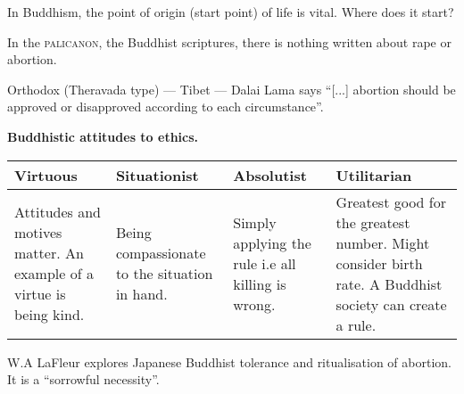 \documentclass{article}
\begin{document}
In Buddhism, the point of origin (start point) of life is vital.  Where does it start?

In the \textsc{palicanon}, the Buddhist scriptures, there is nothing written about rape or abortion.

Orthodox (Theravada type) --- Tibet --- Dalai Lama says ``[...] abortion should be approved or disapproved according to each circumstance''.

\textbf{Buddhistic attitudes to ethics.}

\begin{tabular}{ | p{3cm} | p{3cm} | p{3cm} | p{3cm} | }
\hline
Virtuous & Situationist & Absolutist & Utilitarian \\ \hline
Attitudes and motives matter.  An example of a virtue is being kind. & Being compassionate to the situation in hand. & Simply applying the rule i.e all killing is wrong. & Greatest good for the greatest number.  Might consider birth rate.  A Buddhist society can create a rule. \\
\hline
\end{tabular}

W.A LaFleur explores Japanese Buddhist tolerance and ritualisation of abortion.  It is a ``sorrowful necessity''.
\end{document}
